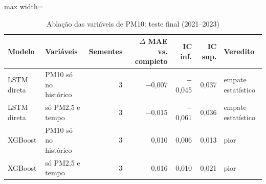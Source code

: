 \begin{table}[!htbp]
    \centering
    \caption{Ablação das variáveis de PM10: teste final (2021--2023)}
    \label{tab:ablacao_pm10_holdout}
    \small
    \begin{adjustbox}{max width=\textwidth}
    \begin{tabular}{llrrrrl}
        \toprule
        Modelo & Variáveis & Sementes & $\Delta$ MAE vs. completo & IC inf. & IC sup. & Veredito \\
        \midrule
        LSTM direta & PM10 só no histórico & 3 & $-$0,007 & $-$0,045 & 0,037 & empate estatístico \\
        LSTM direta & só PM2,5 e tempo & 3 & $-$0,015 & $-$0,061 & 0,036 & empate estatístico \\
        XGBoost & PM10 só no histórico & 3 & 0,010 & 0,006 & 0,013 & pior \\
        XGBoost & só PM2,5 e tempo & 3 & 0,016 & 0,010 & 0,021 & pior \\
        \bottomrule
    \end{tabular}
    \end{adjustbox}
\end{table}
